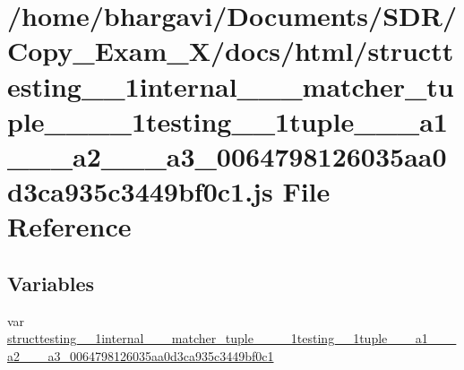 \hypertarget{structtesting__1__1internal__1__1__matcher__tuple__3__01__1__1testing__1__1tuple__3__01__a1__00_881d40cb291e9d3a6376ace8af92a20f}{}\section{/home/bhargavi/\+Documents/\+S\+D\+R/\+Copy\+\_\+\+Exam\+\_\+X/docs/html/structtesting\+\_\+\_\+1internal\+\_\+\_\+\_\+matcher\+\_\+tuple\+\_\+\_\+\_\+\_\+1testing\+\_\+\_\+1tuple\+\_\+\_\+\_\+a1\+\_\+\_\+\_\+a2\+\_\+\_\+\_\+a3\+\_\+0064798126035aa0d3ca935c3449bf0c1.js File Reference}
\label{structtesting__1__1internal__1__1__matcher__tuple__3__01__1__1testing__1__1tuple__3__01__a1__00_881d40cb291e9d3a6376ace8af92a20f}
\subsection*{Variables}
\begin{DoxyCompactItemize}
\item 
var \hyperlink{structtesting__1__1internal__1__1__matcher__tuple__3__01__1__1testing__1__1tuple__3__01__a1__00_881d40cb291e9d3a6376ace8af92a20f_a9b2853029729ff59d6e369c9ae50f8d1}{structtesting\+\_\+\_\+1internal\+\_\+\_\+\_\+matcher\+\_\+tuple\+\_\+\_\+\_\+\_\+1testing\+\_\+\_\+1tuple\+\_\+\_\+\_\+a1\+\_\+\_\+\_\+a2\+\_\+\_\+\_\+a3\+\_\+0064798126035aa0d3ca935c3449bf0c1}
\end{DoxyCompactItemize}


